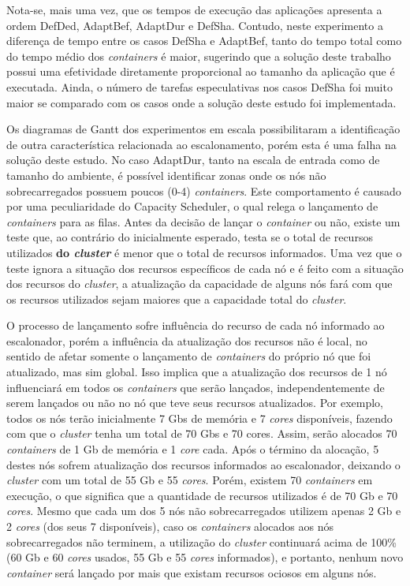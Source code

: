 Nota-se, mais uma vez, que os tempos de execução das aplicações apresenta a ordem DefDed, AdaptBef, AdaptDur e DefSha. Contudo, neste experimento a diferença de tempo entre os casos DefSha e AdaptBef, tanto do tempo total como do tempo médio dos \textit{containers} é maior, sugerindo que a solução deste trabalho possui uma efetividade diretamente proporcional ao tamanho da aplicação que é executada. Ainda, o número de tarefas especulativas nos casos DefSha foi muito maior se comparado com os casos onde a solução deste estudo foi implementada.

Os diagramas de Gantt dos experimentos em escala possibilitaram a identificação de outra característica relacionada ao escalonamento, porém esta é uma falha na solução deste estudo. No caso AdaptDur, tanto na escala de entrada como de tamanho do ambiente, é possível identificar zonas onde os nós não sobrecarregados possuem poucos (0-4) \textit{containers}. Este comportamento é causado por uma peculiaridade do Capacity Scheduler, o qual relega o lançamento de \textit{containers} para as filas. Antes da decisão de lançar o \textit{container} ou não, existe um teste que, ao contrário do inicialmente esperado, testa se o total de recursos utilizados \textbf{do \textit{cluster}} é menor que o total de recursos informados. Uma vez que o teste ignora a situação dos recursos específicos de cada nó e é feito com a situação dos recursos do \textit{cluster}, a atualização da capacidade de alguns nós fará com que os recursos utilizados sejam maiores que a capacidade total do \textit{cluster}.

O processo de lançamento sofre influência do recurso de cada nó informado ao escalonador, porém a influência da atualização dos recursos não é local, no sentido de afetar somente o lançamento de \textit{containers} do próprio nó que foi atualizado, mas sim global. Isso implica que a atualização dos recursos de 1 nó influenciará em todos os \textit{containers} que serão lançados, independentemente de serem lançados ou não no nó que teve seus recursos atualizados. Por exemplo, todos os nós terão inicialmente 7 Gbs de memória e 7 \textit{cores} disponíveis, fazendo com que o \textit{cluster} tenha um total de 70 Gbs e 70 cores. Assim, serão alocados 70 \textit{containers} de 1 Gb de memória e 1 \textit{core} cada. Após o término da alocação, 5 destes nós sofrem atualização dos recursos informados ao escalonador, deixando o \textit{cluster} com um total de 55 Gb e 55 \textit{cores}. Porém, existem 70 \textit{containers} em execução, o que significa que a quantidade de recursos utilizados é de  70 Gb e 70 \textit{cores}. Mesmo que cada um dos 5 nós não sobrecarregados utilizem apenas 2 Gb e 2 \textit{cores} (dos seus 7 disponíveis), caso os \textit{containers} alocados aos nós sobrecarregados não terminem, a utilização do \textit{cluster} continuará acima de 100\% (60 Gb e 60 \textit{cores} usados, 55 Gb e 55 \textit{cores} informados), e portanto, nenhum novo \textit{container} será lançado por mais que existam recursos ociosos em alguns nós.

